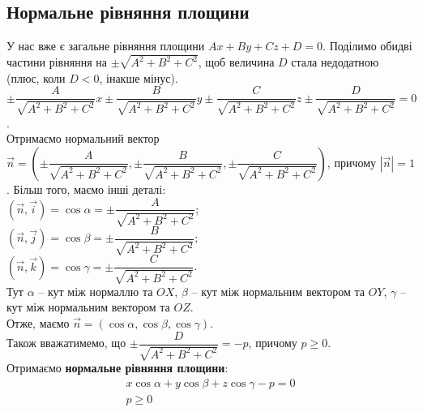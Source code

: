 \documentclass[a4paper, 10pt]{extarticle}
\theoremstyle{theoremdd}
\theoremstyle{theoremdd}
\theoremstyle{theoremdd}
\theoremstyle{theoremdd}
\theoremstyle{theoremdd}
\theoremstyle{theoremdd}
\theoremstyle{theoremdd}
\theoremstyle{theoremdd}
\begin{document}
\subsection{Нормальне рівняння площини}
У нас вже є загальне рівняння площини $Ax + By + Cz + D = 0$. Поділимо обидві частини рівняння на $\pm \sqrt{A^2+B^2+C^2}$, щоб величина $D$ стала недодатною (плюс, коли $D<0$, інакше мінус).\\
$\pm \dfrac{A}{\sqrt{A^2+B^2+C^2}}x \pm \dfrac{B}{\sqrt{A^2+B^2+C^2}}y \pm \dfrac{C}{\sqrt{A^2+B^2+C^2}}z \pm \dfrac{D}{\sqrt{A^2+B^2+C^2}} = 0$.\\
Отримаємо нормальний вектор $\vec{n} = \left(\pm \dfrac{A}{\sqrt{A^2+B^2+C^2}}, \pm \dfrac{B}{\sqrt{A^2+B^2+C^2}}, \pm \dfrac{C}{\sqrt{A^2+B^2+C^2}} \right)$, причому $|\vec{n}| = 1$. Більш того, маємо інші деталі:\\
$(\vec{n}, \vec{i}) = \cos \alpha = \pm \dfrac{A}{\sqrt{A^2+B^2+C^2}}$;\\
$(\vec{n}, \vec{j}) = \cos \beta = \pm \dfrac{B}{\sqrt{A^2+B^2+C^2}}$;\\
$(\vec{n}, \vec{k}) = \cos \gamma = \pm \dfrac{C}{\sqrt{A^2+B^2+C^2}}$.\\
Тут $\alpha$ -- кут між нормаллю та $OX$, $\beta$ -- кут між нормальним вектором та $OY$, $\gamma$ -- кут між нормальним вектором та $OZ$.\\
Отже, маємо $\vec{n} = (\cos \alpha, \cos \beta, \cos \gamma)$.\\
Також вважатимемо, що $\pm \dfrac{D}{\sqrt{A^2+B^2+C^2}} = -p$, причому $p \geq 0$.\\
Отримаємо \textbf{нормальне рівняння площини}:
\begin{align*}
x \cos \alpha + y \cos \beta + z \cos \gamma - p = 0 \\
p \geq 0
\end{align*}

\begin{figure}[H]
\centering
{}
\end{figure}
\end{document}
